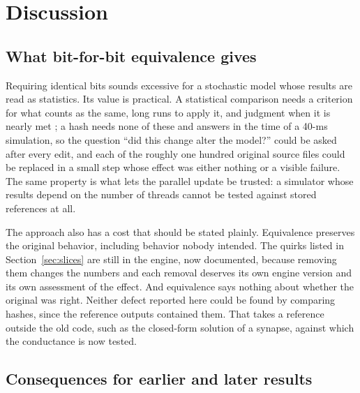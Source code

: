 \documentclass[pdflatex,sn-apa,iicol]{sn-jnl}
\begin{document}
\section{Discussion}\label{sec:discussion}

\subsection{What bit-for-bit equivalence gives}\label{sec:disc-equivalence}

Requiring identical bits sounds excessive for a stochastic model whose results are read as statistics. Its value is practical. A statistical comparison needs a criterion for what counts as the same, long runs to apply it, and judgment when it is nearly met \citep{Gutzen2018}; a hash needs none of these and answers in the time of a 40-ms simulation, so the question ``did this change alter the model?'' could be asked after every edit, and each of the roughly one hundred original source files could be replaced in a small step whose effect was either nothing or a visible failure. The same property is what lets the parallel update be trusted: a simulator whose results depend on the number of threads cannot be tested against stored references at all.

The approach also has a cost that should be stated plainly. Equivalence preserves the original behavior, including behavior nobody intended. The quirks listed in Section~\ref{sec:slices} are still in the engine, now documented, because removing them changes the numbers and each removal deserves its own engine version and its own assessment of the effect. And equivalence says nothing about whether the original was right. Neither defect reported here could be found by comparing hashes, since the reference outputs contained them. That takes a reference outside the old code, such as the closed-form solution of a synapse, against which the conductance is now tested.

\subsection{Consequences for earlier and later results}\label{sec:disc-consequences}
\end{document}
